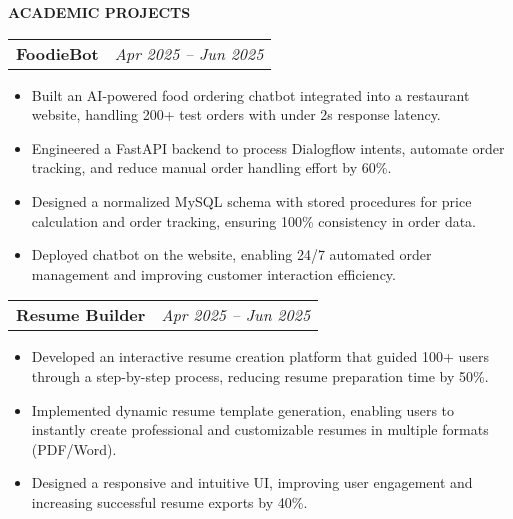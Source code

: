 \documentclass[10pt]{article}
\makeatletter
\newcommand{\sectionheader}[1]{%
  \vspace{6pt}%
  \noindent\colorbox{sectiongray}{%
    \parbox[c][10pt]{\dimexpr\textwidth-2\fboxsep}{%
      \vspace*{\fill}%
      {\fontsize{10}{12}\selectfont\bfseries\MakeUppercase{#1}}%
      \vspace*{\fill}%
    }%
  }%
  \vspace{6pt}%
}
\newcommand{\projectentry}[4]{%
  \begin{tabularx}{\textwidth}{@{}X r@{}}
    {\fontsize{10}{12}\selectfont\bfseries #1} \quad{\fontsize{8}{10}\selectfont #2} & {\fontsize{8.5}{11}\selectfont\itshape #4} \\
  \end{tabularx}
  \vspace{-9.5pt}
  #3
  \vspace{5pt}
}
\makeatother
\begin{document}
\sectionheader{Academic Projects}


\projectentry{FoodieBot}{FastAPI, MySQL, Dialogflow, HTML, CSS, JavaScript}{
\begin{itemize}
  \item Built an AI-powered food ordering chatbot integrated into a restaurant website, handling 200+ test orders with under 2s response latency.
  \item Engineered a FastAPI backend to process Dialogflow intents, automate order tracking, and reduce manual order handling effort by 60\%.
  \item Designed a normalized MySQL schema with stored procedures for price calculation and order tracking, ensuring 100\% consistency in order data.
  \item Deployed chatbot on the website, enabling 24/7 automated order management and improving customer interaction efficiency.
\end{itemize}
}{Apr 2025 -- Jun 2025}

\projectentry{Resume Builder}{React, Node.js, MongoDB, HTML, CSS, JavaScript}{
\begin{itemize}
  \item Developed an interactive resume creation platform that guided 100+ users through a step-by-step process, reducing resume preparation time by 50\%.
  \item Implemented dynamic resume template generation, enabling users to instantly create professional and customizable resumes in multiple formats (PDF/Word).
  \item Designed a responsive and intuitive UI, improving user engagement and increasing successful resume exports by 40\%.
\end{itemize}
}{Apr 2025 -- Jun 2025}
\end{document}
